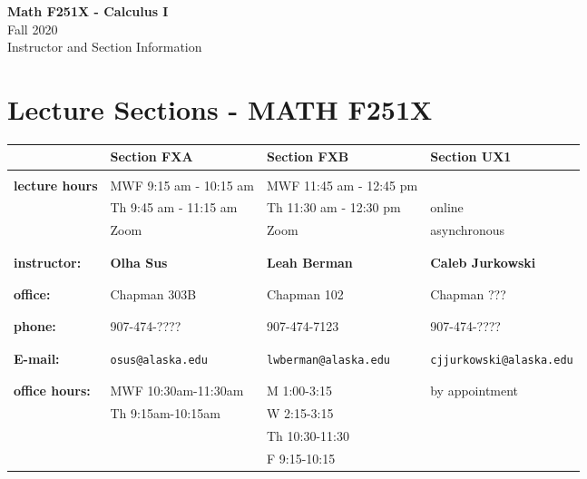 \documentclass[11pt,fleqn]{article}
\begin{document}
\setcounter{secnumdepth}{0}

\vspace*{-1in}
\begin{center}
\large{\textbf{Math F251X - Calculus I}}\\

\large{Fall 2020\\ Instructor and Section Information}
\end{center}

\vfill

\section{Lecture Sections - MATH F251X}

\begin{tabular}{| l || l | l | l |}
\hline \hline
&Section FXA&Section FXB&Section UX1\\
\hline \hline
&&&\\
\textbf{lecture hours}&MWF 9:15 am - 10:15 am&MWF 11:45 am - 12:45 pm&\\
&Th 9:45 am - 11:15 am& Th 11:30 am - 12:30 pm & online\\
&Zoom & Zoom & asynchronous \\
&&&\\
\hline
&&&\\
\textbf{instructor:}&\textbf{Olha Sus}&\textbf{Leah Berman}&\textbf{Caleb Jurkowski}\\
&&&\\
\hline
&&&\\
\textbf{office:}&Chapman 303B&Chapman 102& Chapman ???\\
&&&\\
\hline
&&&\\
\textbf{phone:}&907-474-????&907-474-7123&907-474-????\\ 
&&&\\\hline
&&&\\
\textbf{E-mail:}&\texttt{osus@alaska.edu} &\texttt{lwberman@alaska.edu} &\texttt{cjjurkowski@alaska.edu}\\ &&&\\ \hline
&&&\\ \textbf{office hours:}&MWF 10:30am-11:30am&M 1:00-3:15&by appointment\\ 
&Th 9:15am-10:15am&W 2:15-3:15&\\ 
&&Th 10:30-11:30&\\
&&F 9:15-10:15&\\
 \hline
\end{tabular}
\end{document}
